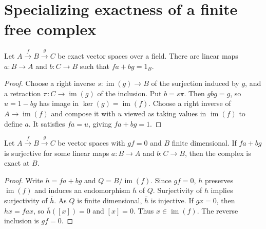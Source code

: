 \section{Specializing exactness of a finite free complex}

\begin{lemma}
\label{lem:kn-specialization-contracting-identity}
\leanok
Let $A\xrightarrow{f}B\xrightarrow{g}C$ be exact vector spaces over a
field.  There are linear maps $a:B\to A$ and $b:C\to B$ such that
$fa+bg=1_B$.
\end{lemma}
\begin{proof}
Choose a right inverse $s:\operatorname{im}(g)\to B$ of the
surjection induced by $g$, and a retraction
$\pi:C\to\operatorname{im}(g)$ of the inclusion.  Put $b=s\pi$.
Then $gbg=g$, so $u=1-bg$ has image in $\ker(g)=\operatorname{im}(f)$.
Choose a right inverse of $A\to\operatorname{im}(f)$ and compose it
with $u$ viewed as taking values in $\operatorname{im}(f)$ to define
$a$.  It satisfies $fa=u$, giving $fa+bg=1$.
\end{proof}

\begin{lemma}
\label{lem:kn-specialization-surjective-contraction}
\leanok
Let $A\xrightarrow{f}B\xrightarrow{g}C$ be vector spaces with
$gf=0$ and $B$ finite dimensional.  If $fa+bg$ is surjective for some
linear maps $a:B\to A$ and $b:C\to B$, then the complex is exact
at $B$.
\end{lemma}
\begin{proof}
Write $h=fa+bg$ and $Q=B/\operatorname{im}(f)$.  Since $gf=0$,
$h$ preserves $\operatorname{im}(f)$ and induces an endomorphism
$\bar h$ of $Q$.  Surjectivity of $h$ implies surjectivity of
$\bar h$.  As $Q$ is finite dimensional, $\bar h$ is injective.
If $gx=0$, then $hx=fax$, so $\bar h([x])=0$ and $[x]=0$.
Thus $x\in\operatorname{im}(f)$.  The reverse inclusion is $gf=0$.
\end{proof}

